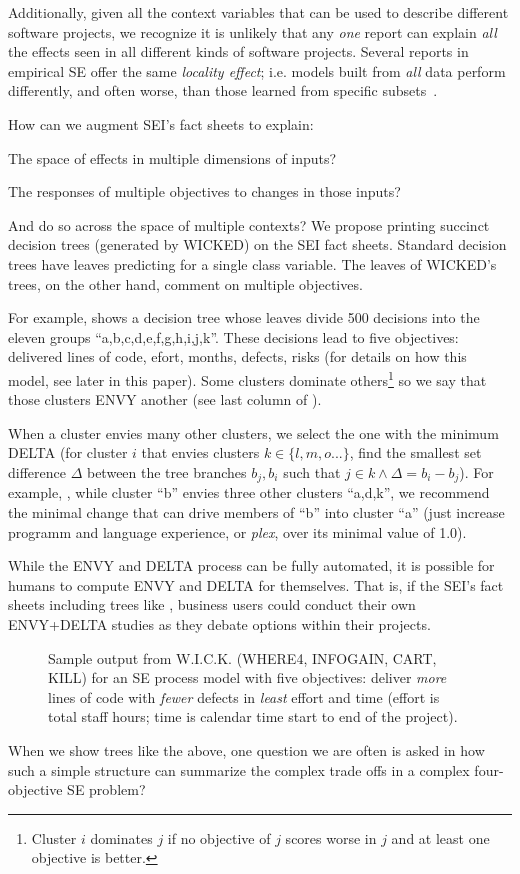  
Additionally, given all the context variables that can be used to describe different
software projects, we recognize it is unlikely that any 
{\em one} report can explain {\em all} the effects
seen in all different kinds of software projects. Several reports in empirical
SE offer the same {\em locality effect}; i.e. models built from  {\em all}  data perform
differently, and often worse, than those learned from specific subsets~\cite{posnet11,betta12,me12d,yang13,emse12}.


How can we augment SEI's fact sheets to  explain:
\bi
\item
The space of effects in multiple dimensions of inputs?
\item
The responses of multiple objectives to changes in those inputs?
\item
And do so across the space of multiple contexts?
\ei
We propose printing succinct decision trees (generated by WICKED)
on the SEI fact sheets. Standard decision trees have leaves
predicting for a single class variable. The leaves of WICKED's trees, on the other hand,
comment on multiple objectives.

For example,  shows a decision tree whose
leaves divide 500 decisions into the eleven groups
``a,b,c,d,e,f,g,h,i,j,k''.  These decisions lead to five
objectives: delivered lines of code, efort,
months, defects, risks (for details on how this
model, see later in this paper).  Some clusters 
dominate  others\footnote{Cluster $i$ dominates $j$ if
no objective  of $j$ scores worse in $j$
and at least one objective is better.} so we say that
those clusters ENVY another (see last column
of ).

When a cluster envies many
other clusters, we select the one with the minimum
DELTA (for cluster $i$ that envies clusters $k\in \{l,m,o...\}$, 
find  the smallest set difference $\Delta$
between the tree branches $b_j,b_i$
such that $j\in k \wedge \Delta=b_i - b_j$). For example,  ,
while cluster ``b'' envies three other clusters ``a,d,k'',
we recommend the minimal change that can drive members of ``b''
into cluster ``a'' (just increase programm and language experience, or {\em plex},
over its minimal value of 1.0).

While the ENVY and DELTA process can be fully automated, it is possible
for humans to compute ENVY and DELTA for themselves. That is, if the SEI's
fact sheets including trees like , business users could 
conduct their own ENVY+DELTA studies as they debate options within their projects.



\begin{figure}[!t]

\caption{Sample output from W.I.C.K. (WHERE4, INFOGAIN, CART, KILL) for an SE process model with five objectives:
deliver {\em more} lines of code with {\em fewer} defects in {\em least} effort and time
(effort is total staff hours; time is calendar time start to end of the project).}\label{fig:egree}
\end{figure}

When we show
trees like the above,
one question we are often is
asked in how  such
a simple structure can summarize
the complex trade offs in a 
complex four-objective
SE problem?

